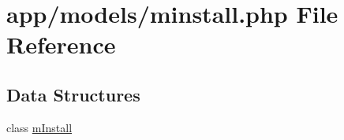 \hypertarget{minstall_8php}{}\section{app/models/minstall.php File Reference}
\label{minstall_8php}
\subsection*{Data Structures}
\begin{DoxyCompactItemize}
\item 
class \hyperlink{classmInstall}{m\+Install}
\end{DoxyCompactItemize}
